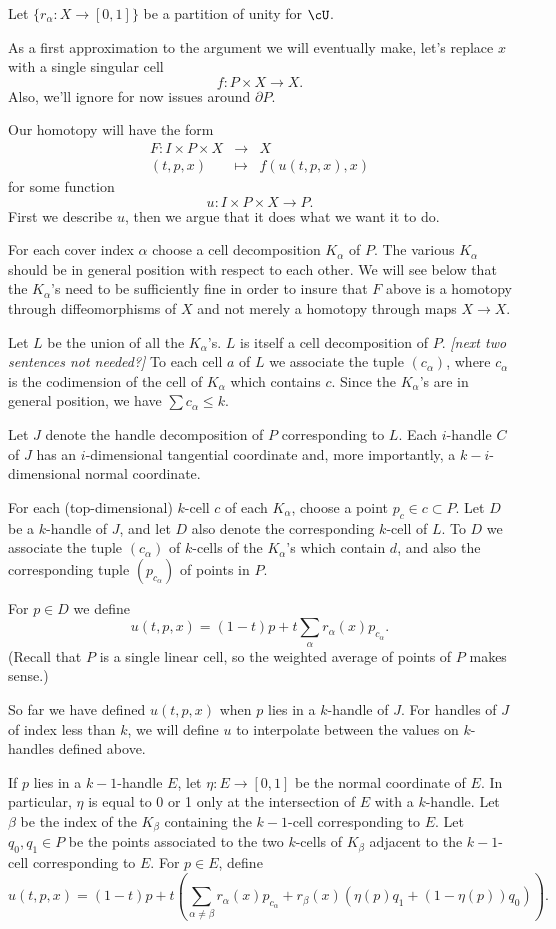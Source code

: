 \documentclass[11pt,leqno]{amsart}
\def\bd{\partial}
\def\sub{\subset}
\def\nn#1{{{\it \small [#1]}}}
\newcommand{\eq}[1]{\begin{displaymath}#1\end{displaymath}}
\newcommand{\eqar}[1]{\begin{eqnarray*}#1\end{eqnarray*}}
\begin{document}
Let $\{r_\alpha : X \to [0,1]\}$ be a partition of unity for $\cU$.

As a first approximation to the argument we will eventually make, let's replace $x$
with a single singular cell
\eq{
    f: P \times X \to X .
}
Also, we'll ignore for now issues around $\bd P$.

Our homotopy will have the form
\eqar{
    F: I \times P \times X &\to& X \\
    (t, p, x) &\mapsto& f(u(t, p, x), x)
}
for some function
\eq{
    u : I \times P \times X \to P .
}
First we describe $u$, then we argue that it does what we want it to do.

For each cover index $\alpha$ choose a cell decomposition $K_\alpha$ of $P$.
The various $K_\alpha$ should be in general position with respect to each other.
We will see below that the $K_\alpha$'s need to be sufficiently fine in order
to insure that $F$ above is a homotopy through diffeomorphisms of $X$ and not
merely a homotopy through maps $X\to X$.

Let $L$ be the union of all the $K_\alpha$'s.
$L$ is itself a cell decomposition of $P$.
\nn{next two sentences not needed?}
To each cell $a$ of $L$ we associate the tuple $(c_\alpha)$,
where $c_\alpha$ is the codimension of the cell of $K_\alpha$ which contains $c$.
Since the $K_\alpha$'s are in general position, we have $\sum c_\alpha \le k$.

Let $J$ denote the handle decomposition of $P$ corresponding to $L$.
Each $i$-handle $C$ of $J$ has an $i$-dimensional tangential coordinate and,
more importantly, a $k{-}i$-dimensional normal coordinate.

For each (top-dimensional) $k$-cell $c$ of each $K_\alpha$, choose a point $p_c \in c \sub P$.
Let $D$ be a $k$-handle of $J$, and let $D$ also denote the corresponding
$k$-cell of $L$.
To $D$ we associate the tuple $(c_\alpha)$ of $k$-cells of the $K_\alpha$'s
which contain $d$, and also the corresponding tuple $(p_{c_\alpha})$ of points in $P$.

For $p \in D$ we define
\eq{
    u(t, p, x) = (1-t)p + t \sum_\alpha r_\alpha(x) p_{c_\alpha} .
}
(Recall that $P$ is a single linear cell, so the weighted average of points of $P$
makes sense.)

So far we have defined $u(t, p, x)$ when $p$ lies in a $k$-handle of $J$.
For handles of $J$ of index less than $k$, we will define $u$ to
interpolate between the values on $k$-handles defined above.

If $p$ lies in a $k{-}1$-handle $E$, let $\eta : E \to [0,1]$ be the normal coordinate
of $E$.
In particular, $\eta$ is equal to 0 or 1 only at the intersection of $E$
with a $k$-handle.
Let $\beta$ be the index of the $K_\beta$ containing the $k{-}1$-cell
corresponding to $E$.
Let $q_0, q_1 \in P$ be the points associated to the two $k$-cells of $K_\beta$
adjacent to the $k{-}1$-cell corresponding to $E$.
For $p \in E$, define
\eq{
    u(t, p, x) = (1-t)p + t \left( \sum_{\alpha \ne \beta} r_\alpha(x) p_{c_\alpha}
            + r_\beta(x) (\eta(p) q_1 + (1-\eta(p)) q_0) \right) .
}
\end{document}
